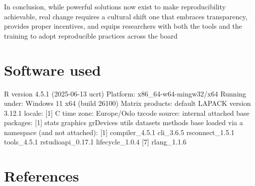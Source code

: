 \documentclass[
  a4paper,
]{article}
\begin{document}
In conclusion, while powerful solutions now exist to make
reproducibility achievable, real change requires a cultural shift one
that embraces transparency, provides proper incentives, and equips
researchers with both the tools and the training to adopt reproducible
practices across the board

\section{Software used}\label{software-used}

R version 4.5.1 (2025-06-13 ucrt) Platform: x86\_64-w64-mingw32/x64
Running under: Windows 11 x64 (build 26100) Matrix products: default
LAPACK version 3.12.1 locale: {[}1{]} C time zone: Europe/Oslo tzcode
source: internal attached base packages: {[}1{]} stats graphics
grDevices utils datasets methods base loaded via a namespace (and not
attached): {[}1{]} compiler\_4.5.1 cli\_3.6.5 rsconnect\_1.5.1
tools\_4.5.1 rstudioapi\_0.17.1 lifecycle\_1.0.4 {[}7{]} rlang\_1.1.6

\section*{References}\label{references}
\end{document}
